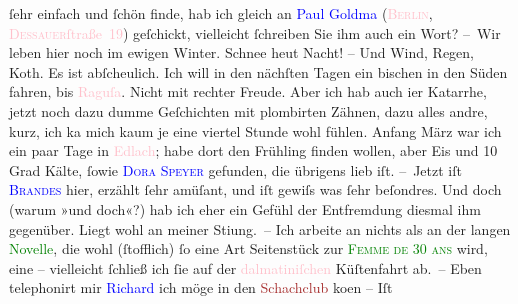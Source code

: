                ſehr einfach und ſchön finde, hab ich gleich an \textcolor{blue}{Paul
                     Goldma{\geminationn}}{}\ledrightnote{\textcolor{blue}{Paul Goldmann}} (\textcolor{pink}{\textsc{Berlin}}{}\ledrightnote{\textcolor{pink}{Berlin}}, \textcolor{pink}{\textsc{Dessauer}ſtraße 19}{}\ledrightnote{\textcolor{pink}{Dessauer Straße}}) geſchickt, vielleicht ſchreiben
               Sie ihm auch ein Wort? \pend
           \pstart
           – Wir leben hier noch im ewigen {\pb}Winter. Schnee heut
               Nacht! – Und Wind, Regen, Koth. Es ist abſcheulich. Ich will in den nächſten Tagen
               ein bischen in den Süden fahren, bis \textcolor{pink}{Raguſa}{}\ledrightnote{\textcolor{pink}{Dubrovnik}}. Nicht
               mit rechter Freude. Aber ich hab auch i{\geminationm}er Katarrhe,
               jetzt noch dazu dumme Geſchichten mit plombirten Zähnen, dazu alles andre, kurz, ich
                  ka{\geminationn}{ }{\pb}mich kaum je eine viertel Stunde wohl fühlen.
                  Anfang März war ich ein paar Tage in \textcolor{pink}{Edlach}{}\ledrightnote{\textcolor{pink}{Edlach}}; habe dort den Frühling finden wollen, aber Eis und 10 Grad Kälte,
               ſowie \textcolor{blue}{\textsc{Dora Speyer}}{}\ledrightnote{\textcolor{blue}{Dora Michaelis}} gefunden, die übrigens lieb iſt.\pend
           \pstart
           – Jetzt iſt \textcolor{blue}{\textsc{Brandes}}{}\ledrightnote{\textcolor{blue}{Georg Brandes}} hier, erzählt ſehr amüſant, und iſt gewiſs was ſehr beſondres. Und {\pb}doch (warum »und doch«?) hab ich eher ein Gefühl der
               Entfremdung diesmal ihm gegenüber. Liegt wohl an meiner Sti{\geminationm}ung. –\pend
           \pstart
           Ich arbeite an nichts als an der langen \textcolor{green}{Novelle}{}, die wohl (ſtofflich) ſo eine Art Seitenstück zur
                  \textcolor{green}{\textsc{Femme de 30 ans}}{}\ledrightnote{\textcolor{green}{Eine Frau von dreißig Jahren}} wird, eine \label{K_L01024_2v}\label{K_L01024_2h}
               – viel{\pb}leicht ſchließ ich ſie auf der \textcolor{pink}{dalmatiniſchen}{}\ledrightnote{\textcolor{pink}{Dalmatien}} Küſtenfahrt ab. –\pend
           \pstart
           Eben telephonirt mir \textcolor{blue}{Richard}{}\ledrightnote{\textcolor{blue}{Richard Beer-Hofmann}} ich möge in den \textcolor{brown}{Schachclub}{}\ledrightnote{\textcolor{brown}{Wiener Schachclub}} ko{\geminationm}en – Iſt
